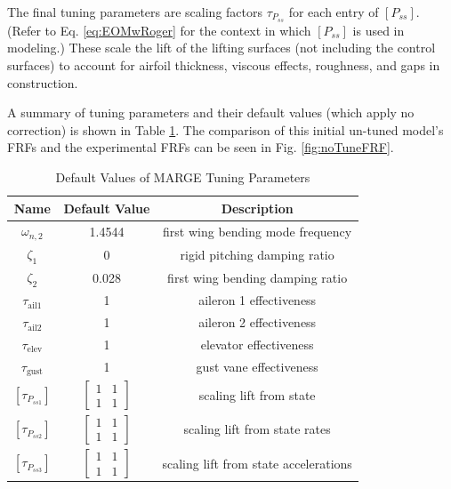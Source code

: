 The final tuning parameters are scaling factors $\tau_{P_{ss}}$ for each entry of $[P_{ss}]$. (Refer to Eq. \ref{eq:EOMwRoger} for the context in which $[P_{ss}]$ is used in modeling.) These scale the lift of the lifting surfaces (not including the control surfaces) to account for airfoil thickness, viscous effects, roughness, and gaps in construction.

A summary of tuning parameters and their default values (which apply no correction) is shown in Table \ref{tab:tuningParams}. The comparison of this initial un-tuned model's FRFs and the experimental FRFs can be seen in Fig. \ref{fig:noTuneFRF}.
\begin{table}[h]
	\centering
	\label{tab:tuningParams}
	\caption{Default Values of MARGE Tuning Parameters}
	\begin{tabular}{ccc}
		\hline\hline
		Name & Default Value & Description \\
		\hline
		$\omega_{n,2}$ & 1.4544 & first wing bending mode frequency \\
		$\zeta_1$ & 0 & rigid pitching damping ratio \\
		$\zeta_2$ & 0.028 & first wing bending damping ratio \\
		$\tau_\text{ail1}$ & 1 & aileron 1 effectiveness \\
		$\tau_\text{ail2}$ & 1 & aileron 2 effectiveness \\
		$\tau_\text{elev}$ & 1 & elevator effectiveness \\
		$\tau_\text{gust}$ & 1 & gust vane effectiveness \\
		$\left[\tau_{P_{ss1}}\right]$ & $\begin{bmatrix} 1 & 1 \\ 1 & 1 \end{bmatrix}$ & scaling lift from state \\
		$\left[\tau_{P_{ss2}}\right]$ & $\begin{bmatrix} 1 & 1 \\ 1 & 1 \end{bmatrix}$ & scaling lift from state rates \\
		$\left[\tau_{P_{ss3}}\right]$ & $\begin{bmatrix} 1 & 1 \\ 1 & 1 \end{bmatrix}$ & scaling lift from state accelerations \\
		\hline\hline
	\end{tabular}
\end{table}

